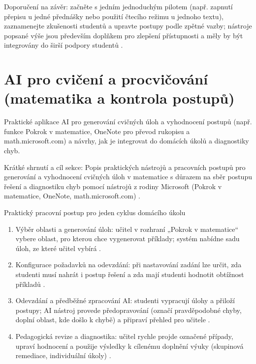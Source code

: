 \documentclass{report}%
\begin{document}
Doporučení na závěr: začněte s jedním jednoduchým pilotem (např. zapnutí přepisu u jedné přednášky nebo použití čtecího režimu u jednoho textu), zaznamenejte zkušenosti studentů a upravte postupy podle zpětné vazby; nástroje popsané výše jsou především doplňkem pro zlepšení přístupnosti a měly by být integrovány do širší podpory studentů \cite{kb_ai_101_tipu_pdf_04e4a115_page_11_1, kb_ai_101_tipu_pdf_04e4a115_page_7_1}.%

%
\section{AI pro cvičení a procvičování (matematika a kontrola postupů)}%
Praktické aplikace AI pro generování cvičných úloh a vyhodnocení postupů (např. funkce Pokrok v matematice, OneNote pro převod rukopisu a math.microsoft.com) a návrhy, jak je integrovat do domácích úkolů a diagnostiky chyb.%


%
Krátké shrnutí a cíl sekce: Popis praktických nástrojů a pracovních postupů pro generování a vyhodnocení cvičných úloh v matematice s důrazem na sběr postupu řešení a diagnostiku chyb pomocí nástrojů z rodiny Microsoft (Pokrok v matematice, OneNote, math.microsoft.com) \cite{kb_ai_101_tipu_pdf_04e4a115_page_8_1}.

Praktický pracovní postup pro jeden cyklus domácího úkolu
\begin{enumerate}
  \item Výběr oblasti a generování úloh: učitel v rozhraní „Pokrok v matematice“ vybere oblast, pro kterou chce vygenerovat příklady; systém nabídne sadu úloh, ze které učitel vybírá \cite{kb_ai_101_tipu_pdf_04e4a115_page_8_1}.
  \item Konfigurace požadavků na odevzdání: při nastavování zadání lze určit, zda studenti musí nahrát i postup řešení a zda mají studenti hodnotit obtížnost příkladů \cite{kb_ai_101_tipu_pdf_04e4a115_page_8_1}.
  \item Odevzdání a předběžné zpracování AI: studenti vypracují úlohy a přiloží postupy; AI nástroj provede předopravování (označí pravděpodobné chyby, doplní oblast, kde došlo k chybě) a připraví přehled pro učitele \cite{kb_ai_101_tipu_pdf_04e4a115_page_8_1}.
  \item Pedagogická revize a diagnostika: učitel rychle projde označené případy, upraví hodnocení a použije výsledky k cílenému doplnění výuky (skupinová remediace, individuální úkoly) \cite{kb_ai_101_tipu_pdf_04e4a115_page_8_1}.
\end{enumerate}
\end{document}
